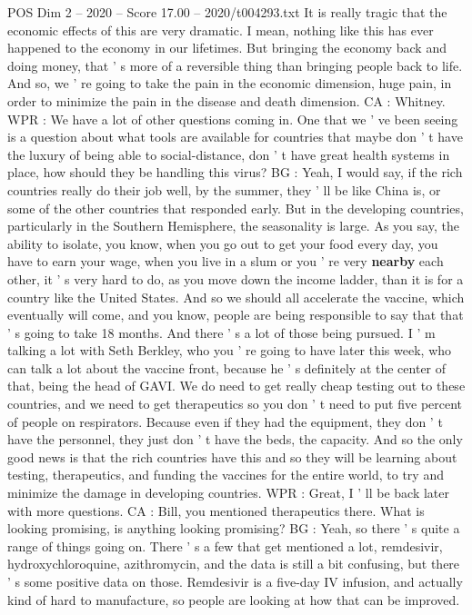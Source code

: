 \begin{textsample}{POS Dim 2 – 2020 – Score 17.00 – 2020/t004293.txt}
It is really tragic that the economic effects of this are very dramatic.
I mean, nothing like this has ever happened to the economy in our lifetimes.
But bringing the economy back and doing money, that ' s more of a reversible thing than bringing people back to life.
And so, we ' re going to take the pain in the economic dimension, huge pain, in order to minimize the pain in the disease and death dimension.
CA : Whitney.
WPR : We have a lot of other questions coming in.
One that we ' ve been seeing is a question about what tools are available for countries that maybe don ' t have the luxury of being able to social-distance, don ' t have great health systems in place, how should they be handling this virus?
BG : Yeah, I would say, if the rich countries really do their job well, by the summer, they ' ll be like China is, or some of the other countries that responded early.
But in the developing countries, particularly in the Southern Hemisphere, the seasonality is large.
As you say, the ability to isolate, you know, when you go out to get your food every day, you have to earn your wage, when you live in a slum or you ' re very \textbf{nearby} each other, it ' s very hard to do, as you move down the income ladder, than it is for a country like the United States.
And so we should all accelerate the vaccine, which eventually will come, and you know, people are being responsible to say that that ' s going to take 18 months.
And there ' s a lot of those being pursued.
I ' m talking a lot with Seth Berkley, who you ' re going to have later this week, who can talk a lot about the vaccine front, because he ' s definitely at the center of that, being the head of GAVI.
We do need to get really cheap testing out to these countries, and we need to get therapeutics so you don ' t need to put five percent of people on respirators.
Because even if they had the equipment, they don ' t have the personnel, they just don ' t have the beds, the capacity.
And so the only good news is that the rich countries have this and so they will be learning about testing, therapeutics, and funding the vaccines for the entire world, to try and minimize the damage in developing countries.
WPR : Great, I ' ll be back later with more questions.
CA : Bill, you mentioned therapeutics there.
What is looking promising, is anything looking promising?
BG : Yeah, so there ' s quite a range of things going on.
There ' s a few that get mentioned a lot, remdesivir, hydroxychloroquine, azithromycin, and the data is still a bit confusing, but there ' s some positive data on those.
Remdesivir is a five-day IV infusion, and actually kind of hard to manufacture, so people are looking at how that can be improved.

\end{textsample}
